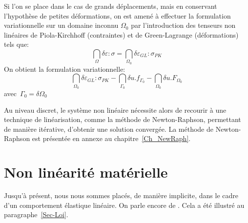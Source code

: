 Si l'on se place dans le cas de grands déplacements, mais en conservant l'hypothèse de petites déformations, on est amené à effectuer la formulation variationnelle sur un domaine inconnu $\Omega_0$ par l'introduction des tenseurs non linéaires de Piola-Kirchhoff (contraintes) et de Green-Lagrange (déformations) tels que:
\begin{equation}
\dint_\Omega \delta\varepsilon:\sigma = \dint_{\Omega_0} \delta\varepsilon_{GL}:\sigma_{PK}
\end{equation}
On obtient la formulation variationnelle:
\begin{equation}
\dint_{\Omega_0}\delta\varepsilon_{GL}:\sigma_{PK} -\dint_{\Gamma_0} \delta u.f_{\Gamma_0}
-\dint_{\Omega_0} \delta u.F_{\Omega_0}
\end{equation}
avec~$\Gamma_0=\delta\Omega_0$

\medskip
Au niveau discret, le système non linéaire nécessite alors de recourir à une technique de linéarisation, comme la méthode de Newton-Raphson, permettant de manière itérative, d'obtenir une solution convergée. La méthode de
Newton-Raphson est présentée en annexe au chapitre~\ref{Ch_NewRaph}.








\medskip
\section{Non linéarité matérielle}\label{Sec-NLMat}

Jusqu'à présent, nous nous sommes placés, de manière implicite, dans le cadre d'un comportement élastique linéaire. On parle encore de . Cela a été illustré au paragraphe~\ref{Sec-Loi}.

